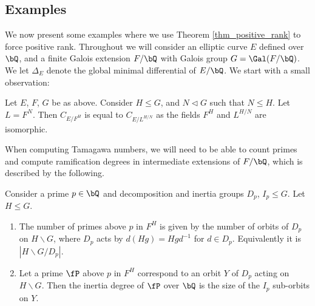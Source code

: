 \subsection{Examples}

We now present some examples where we use Theorem \ref{thm_positive_rank} to force positive rank. Throughout we will consider an elliptic curve $E$ defined over $\bQ$, and a finite Galois extension $F / \bQ$ with Galois group $G = \Gal(F / \bQ)$. We let $\Delta_E$ denote the global minimal differential of $E / \bQ$. 
We start with a small observation:

\begin{rem}
   Let $E$, $F$, $G$ be as above. Consider $H \leq G$, and $N \triangleleft G$ such that $N \leq H$. Let $L = F^N$. Then $C_{E / F^H}$ is equal to $C_{E / L^{H/N}}$ as the fields $F^H$ and $L^{H/ N}$ are isomorphic. 
    
\end{rem}



When computing Tamagawa numbers, we will need to be able to count primes and compute ramification degrees in intermediate extensions of $F / \bQ$, which is described by the following. 

\begin{exercise}\label{ex-counting}
Consider a prime $p \in \bQ$ and decomposition and inertia groups $D_p$, $I_p \leq G$. Let $H \leq G$. 
\begin{enumerate}
    \setlength\itemsep{0em}
    \item The number of primes above $p$ in $F^H$ is given by the number of orbits of $D_p$ on $H \backslash G$, where $D_p$ acts by $d(Hg) = H g d^{-1}$ for $d \in D_p$. Equivalently it is $|H \backslash G / D_p|$.
    \item Let a prime $\fP$ above $p$ in $F^H$ correspond to an orbit $Y$ of $D_p$ acting on $H \backslash G$. Then the inertia degree of $\fP$ over $\bQ$ is the size of the $I_p$ sub-orbits on $Y$. 
\end{enumerate}
\end{exercise}



